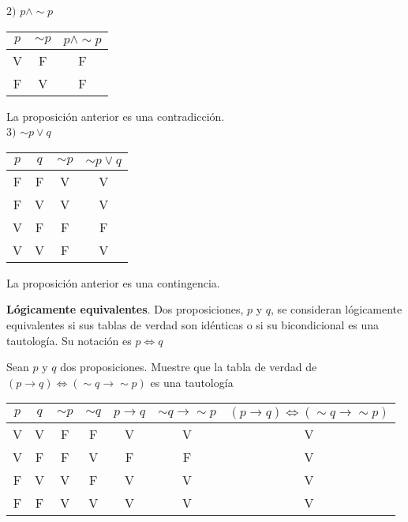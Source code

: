 $2)$ $p\wedge \sim p$\\
\begin{center}
	\begin{tabular}{|c|c|c|}
\hline
$p$&$\sim p$& $p\wedge \sim p$\\
\hline
V&F&F\\
\hline
F&V&F\\
\hline
	\end{tabular}
\end{center}
La proposición anterior es una contradicción.\\

$3)$ $\sim p\vee q$
\begin{center}
	\begin{tabular}{|c|c|c|c|}
\hline
$p$&$q$&$\sim p$& $\sim p\vee q$\\
\hline
F&F&V&V\\
\hline
F&V&V&V\\
\hline
V&F&F&F\\
\hline
V&V&F&V\\
\hline
	\end{tabular}
\end{center}
La proposición anterior es una contingencia.\\

\begin{mydef}
\textbf{Lógicamente equivalentes}.
Dos proposiciones, $p$ y $q$, se consideran lógicamente equivalentes si sus tablas de verdad son idénticas o si su bicondicional es una tautología. Su notación es $p\Leftrightarrow q$ 
\end{mydef}

\begin{myexample}
Sean $p$ y $q$ dos proposiciones. Muestre que la tabla de verdad de $(p\rightarrow q)\Leftrightarrow (\sim q\rightarrow\sim p)$ es una tautología
\end{myexample}

\begin{center}
	\begin{tabular}{|c|c|c|c|c|c|c|}
\hline
$p$&$q$&$\sim p$& $\sim q$&$p\rightarrow q$&$\sim q\rightarrow\sim p$&$(p\rightarrow q)\Leftrightarrow (\sim q\rightarrow\sim p)$\\
\hline
V&V&F&F&V&V&V\\
\hline
V&F&F&V&F&F&V\\
\hline
F&V&V&F&V&V&V\\
\hline
F&F&V&V&V&V&V\\
\hline
	\end{tabular}
\end{center}

